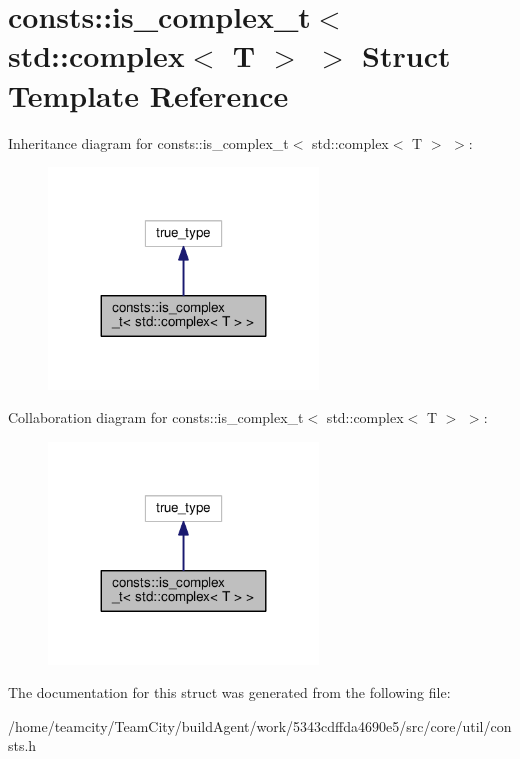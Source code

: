 \hypertarget{structconsts_1_1is__complex__t_3_01std_1_1complex_3_01T_01_4_01_4}{}\section{consts\+:\+:is\+\_\+complex\+\_\+t$<$ std\+:\+:complex$<$ T $>$ $>$ Struct Template Reference}
\label{structconsts_1_1is__complex__t_3_01std_1_1complex_3_01T_01_4_01_4}


Inheritance diagram for consts\+:\+:is\+\_\+complex\+\_\+t$<$ std\+:\+:complex$<$ T $>$ $>$\+:\nopagebreak
\begin{figure}[H]
\begin{center}
\leavevmode
\includegraphics[width=203pt]{structconsts_1_1is__complex__t_3_01std_1_1complex_3_01T_01_4_01_4__inherit__graph}
\end{center}
\end{figure}


Collaboration diagram for consts\+:\+:is\+\_\+complex\+\_\+t$<$ std\+:\+:complex$<$ T $>$ $>$\+:\nopagebreak
\begin{figure}[H]
\begin{center}
\leavevmode
\includegraphics[width=203pt]{structconsts_1_1is__complex__t_3_01std_1_1complex_3_01T_01_4_01_4__coll__graph}
\end{center}
\end{figure}


The documentation for this struct was generated from the following file\+:\begin{DoxyCompactItemize}
\item 
/home/teamcity/\+Team\+City/build\+Agent/work/5343cdffda4690e5/src/core/util/consts.\+h\end{DoxyCompactItemize}
